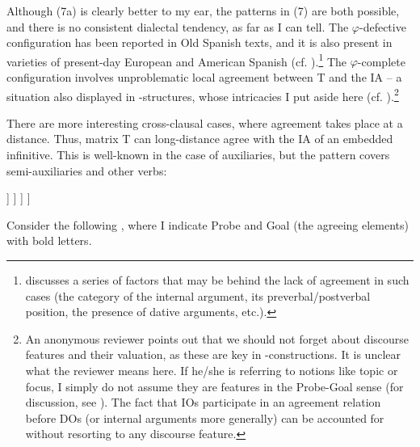 \documentclass[output=paper]{langsci/langscibook}
\begin{document}
Although (7a) is clearly better to my ear, the patterns in (7) are both possible, and there is no consistent dialectal tendency, as far as I can tell. The $\varphi $-defective configuration has been reported in Old Spanish texts, and it is also present in varieties of present-day European and American Spanish (cf. \citealt{Mendikoetxea1999}).\footnote{\citet{RAE-ASALE2009} discusses a series of factors that may be behind the lack of agreement in such cases (the category of the internal argument, its preverbal/postverbal position, the presence of dative arguments, etc.).} The $\varphi $-complete configuration involves unproblematic local agreement between T and the IA – a situation also displayed in \DAT-\NOM structures, whose intricacies I put aside here (cf. \citealt{López2007,Chomsky2008}).\footnote{An anonymous reviewer points out that we should not forget about discourse features and their valuation, as these are key in \DAT-\NOM constructions. It is unclear what the reviewer means here. If he/she is referring to notions like topic or focus, I simply do not assume they are features in the Probe-Goal sense (for discussion, see \citealt{Chomsky2001Derivation,Chomsky2008,Chomsky2017,Ott2016}). The fact that IOs participate in an agreement relation before DOs (or internal arguments more generally)  can be accounted for without resorting to any discourse feature.} 

There are more interesting cross-clausal cases, where agreement takes place at a distance. Thus, matrix T can long-distance agree with the IA of an embedded infinitive. This is well-known in the case of auxiliaries, but the pattern covers semi-auxiliaries and other verbs: 

\ea%
\settowidth\jamwidth{[\textsc{semiaux} = try, need, etc.]}
    \label{ex:gallego:8}
    \ea\relax [ T [ SE  V\textsubscript{AUX}         [ INF XP ] ] ]      \jambox{[\textsc{aux} = can, should, etc.]}
    \ex\relax [ T [ SE  V\textsubscript{SEMIAUX}  [ INF XP ] ] ]         \jambox{[\textsc{semiaux} = try, need, etc.]}
    \z
\z    

Consider the following \citep[Chapter~28]{RAE-ASALE2009}, where I indicate Probe and Goal (the agreeing elements) with bold letters.
\end{document}
